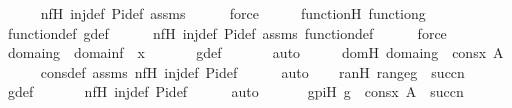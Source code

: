 \begin{isabellebody}
\ \ \ \ \isamarkupfalse%
\ nfH\ inj{\isacharunderscore}{\kern0pt}def\ Pi{\isacharunderscore}{\kern0pt}def\ assms\isanewline
\ \ \ \ \isamarkupfalse%
\ force\isanewline
\ \ \isamarkupfalse%
\ \isamarkupfalse%
\ functionH{\isacharcolon}{\kern0pt}\ {\isachardoublequoteopen}function{\isacharparenleft}{\kern0pt}g{\isacharparenright}{\kern0pt}{\isachardoublequoteclose}\ \isanewline
\ \ \ \ \isamarkupfalse%
\ function{\isacharunderscore}{\kern0pt}def\ g{\isacharunderscore}{\kern0pt}def\isanewline
\ \ \ \ \isamarkupfalse%
\ nfH\ inj{\isacharunderscore}{\kern0pt}def\ Pi{\isacharunderscore}{\kern0pt}def\ assms\ function{\isacharunderscore}{\kern0pt}def\isanewline
\ \ \ \ \isamarkupfalse%
\ force\isanewline
\isanewline
\ \ \isamarkupfalse%
\ {\isachardoublequoteopen}domain{\isacharparenleft}{\kern0pt}g{\isacharparenright}{\kern0pt}\ {\isacharequal}{\kern0pt}\ domain{\isacharparenleft}{\kern0pt}f{\isacharparenright}{\kern0pt}\ {\isasymunion}\ {\isacharbraceleft}{\kern0pt}x{\isacharbraceright}{\kern0pt}{\isachardoublequoteclose}\ \isanewline
\ \ \ \ \isamarkupfalse%
\ g{\isacharunderscore}{\kern0pt}def\ \isanewline
\ \ \ \ \isamarkupfalse%
\ auto\isanewline
\ \ \isamarkupfalse%
\ \isamarkupfalse%
\ domH{\isacharcolon}{\kern0pt}\ {\isachardoublequoteopen}domain{\isacharparenleft}{\kern0pt}g{\isacharparenright}{\kern0pt}\ {\isacharequal}{\kern0pt}\ cons{\isacharparenleft}{\kern0pt}x{\isacharcomma}{\kern0pt}\ A{\isacharparenright}{\kern0pt}{\isachardoublequoteclose}\isanewline
\ \ \ \ \isamarkupfalse%
\ cons{\isacharunderscore}{\kern0pt}def\ assms\ nfH\ inj{\isacharunderscore}{\kern0pt}def\ Pi{\isacharunderscore}{\kern0pt}def\isanewline
\ \ \ \ \isamarkupfalse%
\ auto\isanewline
\isanewline
\ \ \isamarkupfalse%
\ ranH{\isacharcolon}{\kern0pt}\ {\isachardoublequoteopen}range{\isacharparenleft}{\kern0pt}g{\isacharparenright}{\kern0pt}\ {\isasymsubseteq}\ succ{\isacharparenleft}{\kern0pt}n{\isacharparenright}{\kern0pt}{\isachardoublequoteclose}\ \isanewline
\ \ \ \ \isamarkupfalse%
\ g{\isacharunderscore}{\kern0pt}def\ \isanewline
\ \ \ \ \isamarkupfalse%
\ nfH\ inj{\isacharunderscore}{\kern0pt}def\ Pi{\isacharunderscore}{\kern0pt}def\isanewline
\ \ \ \ \isamarkupfalse%
\ auto\isanewline
\ \ \isanewline
\ \ \isamarkupfalse%
\ gpiH{\isacharcolon}{\kern0pt}\ {\isachardoublequoteopen}g\ {\isasymin}\ cons{\isacharparenleft}{\kern0pt}x{\isacharcomma}{\kern0pt}\ A{\isacharparenright}{\kern0pt}\ {\isasymrightarrow}\ succ{\isacharparenleft}{\kern0pt}n{\isacharparenright}{\kern0pt}{\isachardoublequoteclose}\ \isanewline

\end{isabellebody}
